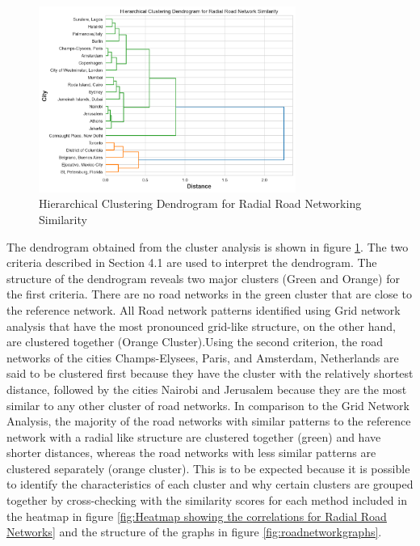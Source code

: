 \begin{figure}[!ht]
\centering
\includegraphics[width=0.75\textwidth,center]{picture/Radial/radial_dendrogram2.png}
\caption[Hierarchical Clustering Dendrogram for Radial Road Networking Similarity]{Hierarchical Clustering Dendrogram for Radial Road Networking Similarity}
\label{fig:Hierarchical Clustering Dendrogram for Radial Road Networking Similarity}
\end{figure}

The dendrogram obtained from the cluster analysis is shown in figure \ref{fig:Hierarchical Clustering Dendrogram for Radial Road Networking Similarity}. The two criteria described in Section 4.1 are used to interpret the dendrogram. The structure of the dendrogram reveals two major clusters (Green and Orange) for the first criteria. There are no road networks in the green cluster that are close to the reference network. All Road network patterns identified using Grid network analysis that have the most pronounced grid-like structure, on the other hand, are clustered together (Orange Cluster).Using the second criterion, the road networks of the cities Champs-Elysees, Paris, and Amsterdam, Netherlands are said to be clustered first because they have the cluster with the relatively shortest distance, followed by the cities Nairobi and Jerusalem because they are the most similar to any other cluster of road networks.
In comparison to the Grid Network Analysis, the majority of the road networks with similar patterns to the reference network with a radial like structure are clustered together (green) and have shorter distances, whereas the road networks with less similar patterns are clustered separately (orange cluster). This is to be expected because it is possible to identify the characteristics of each cluster and why certain clusters are grouped together by cross-checking with the similarity scores for each method included in the heatmap in figure \ref{fig:Heatmap showing the correlations for Radial Road Networks} and the structure of the graphs in figure \ref{fig:roadnetworkgraphs}.

